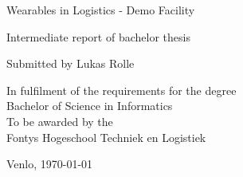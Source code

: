 \begin{titlepage}
    \begin{center}
        \vspace*{1cm}
        
        \Huge
        Wearables in Logistics - Demo Facility
                
        \vspace{1cm}
        \LARGE
        Intermediate report of bachelor thesis
        
        \vspace{5cm}
        Submitted by Lukas Rolle
        
        \vspace{1cm}
        \large
        In fulfilment of the requirements for the degree\\
        Bachelor of Science in Informatics\\
        To be awarded by the\\
        Fontys Hogeschool Techniek en Logistiek
        
        \vfill
        
        \normalsize
        Venlo, \today
        
    \end{center}
\end{titlepage}
